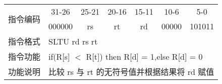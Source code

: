 \documentclass[a4paper,UTF8,fntef]{ctexart}
\begin{document}
	\begin{table}[!hbp]
		\centering
		\begin{tabular}{|c|c|c|c|c|c|c|}
		\hline
		\multirow{2}{*}{指令编码} & 31-26&25-21 & 20-16&15-11 &10-6 &5-0\\
		\cline{2-7} & 000000 & rs & rt & rd & 00000 & 101011 \\
		\hline
		指令格式&\multicolumn{6}{|l|}{SLTU rd rs rt}\\
		\hline		
		指令功能&\multicolumn{6}{|l|}{if(R[s] $<$ R[t]) then R[d] = 1,else R[d] = 0}\\
		\hline		
		功能说明&\multicolumn{6}{|l|}{比较 rs 与 rt 的无符号值并根据结果将 rd 赋值}\\
		\hline
		\end{tabular}
	\end{table}
\newpage
\end{document}

